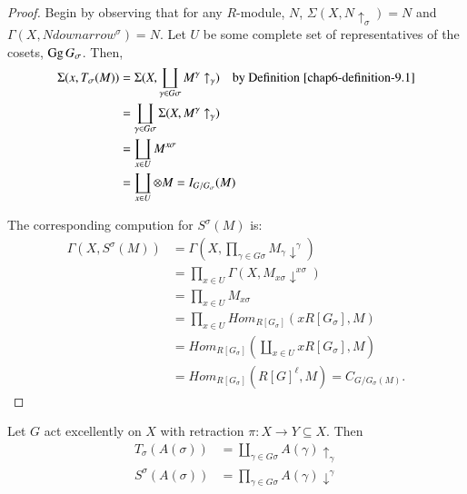 \begin{proof}
Begin by observing that for any $R$-module, $N$, $\Sigma(X, N\uparrow_{\sigma}) = N$ and $\Gamma (X, N downarrow^{\sigma}) = N$. Let $U$ be some complete set of representatives of the cosets, $\operatorname{Gg} G_{\sigma}$. Then,
\begin{align*}
\Sigma(x, T_{\sigma}(M)) &= \Sigma(X, \coprod_{\gamma \in G\sigma}M^{\gamma} \uparrow_{\gamma}) \quad \text{by Definition} \;\ref{chap6-definition-9.1}\\
&= \coprod_{\gamma \in G\sigma} \Sigma(X, M^{\gamma} \uparrow_{\gamma})\\
& = \coprod_{x \in U} M^{x\sigma}\\
& = \coprod_{x \in U} \otimes M = I_{G/G_{\sigma}}(M)
\end{align*}

The corresponding compution for $S^{\sigma}(M)$ is:
\begin{align*}
\Gamma (X, S^{\sigma}(M)) &= \Gamma(X, \prod_{\gamma \in G\sigma}M_{\gamma}\downarrow^{\gamma})\\
& = \prod_{x \in U} \Gamma(X, M_{x\sigma} \downarrow^{x\sigma})\\
& = \prod_{x \in U} M_{x\sigma}\\
&= \prod_{x \in U}Hom_{R[G_{\sigma}]}(x R[G_{\sigma}], M)\\
& = Hom_{R[G_{\sigma}]}(\coprod_{x \in U} xR[G_{\sigma}], M)\\
& = Hom_{R[G_{\sigma}]}(R[G]^{\ell}, M ) = C_{G/G_{\sigma}(M)}.
\end{align*}
\end{proof}

\begin{secprop}\label{chap6-proposition-9.7}
Let $G$ act excellently on $X$ with retraction $\pi : X\rightarrow Y \subseteq X$. Then
\begin{align*}
T_{\sigma}(A(\sigma)) &= \coprod_{\gamma \in G\sigma}A(\gamma )\uparrow_{\gamma}\\
S^{\sigma}(A(\sigma)) &= \prod_{\gamma \in G\sigma}A(\gamma)\downarrow^{\gamma}
\end{align*}
\end{secprop}

